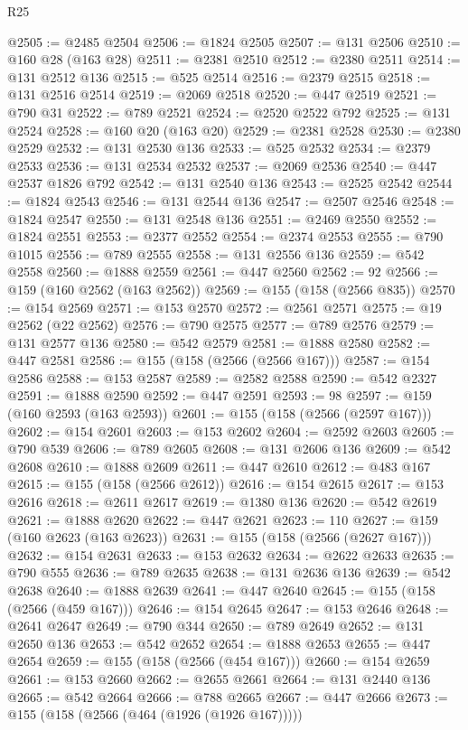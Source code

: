 \begin{lexlean}{R25}
\begin{coremodule}
{{{{{{{{{{{{{{{{{{{{{{{{{{{{{{{{{{{{{{{{{{{{{{{{{{{{{{{{{{{{{{{{{{{{{{{{{{{{{{{{{{{{{{{{{{{{{{{{{{{{{{{{{{{{{{{{{{{{{{{{{{{{{{{{{{{{{{{{{{{{{{{{{{{{{{{{{{{{{{{{{{{{{{{{{{{{{{{{{{{{{{{{{{{{{{{{{{{{{{{@2505 := @2485 @2504
@2506 := @1824 @2505
@2507 := @131 @2506
@2510 := @160 @28 (@163 @28)
@2511 := @2381 @2510
@2512 := @2380 @2511
@2514 := @131 @2512 @136
@2515 := @525 @2514
@2516 := @2379 @2515
@2518 := @131 @2516 @2514
@2519 := @2069 @2518
@2520 := @447 @2519
@2521 := @790 @31
@2522 := @789 @2521
@2524 := @2520 @2522 @792
@2525 := @131 @2524
@2528 := @160 @20 (@163 @20)
@2529 := @2381 @2528
@2530 := @2380 @2529
@2532 := @131 @2530 @136
@2533 := @525 @2532
@2534 := @2379 @2533
@2536 := @131 @2534 @2532
@2537 := @2069 @2536
@2540 := @447 @2537 @1826 @792
@2542 := @131 @2540 @136
@2543 := @2525 @2542
@2544 := @1824 @2543
@2546 := @131 @2544 @136
@2547 := @2507 @2546
@2548 := @1824 @2547
@2550 := @131 @2548 @136
@2551 := @2469 @2550
@2552 := @1824 @2551
@2553 := @2377 @2552
@2554 := @2374 @2553
@2555 := @790 @1015
@2556 := @789 @2555
@2558 := @131 @2556 @136
@2559 := @542 @2558
@2560 := @1888 @2559
@2561 := @447 @2560
@2562 := 92
@2566 := @159 (@160 @2562 (@163 @2562))
@2569 := @155 (@158 (@2566 @835))
@2570 := @154 @2569
@2571 := @153 @2570
@2572 := @2561 @2571
@2575 := @19 @2562 (@22 @2562)
@2576 := @790 @2575
@2577 := @789 @2576
@2579 := @131 @2577 @136
@2580 := @542 @2579
@2581 := @1888 @2580
@2582 := @447 @2581
@2586 := @155 (@158 (@2566 (@2566 @167)))
@2587 := @154 @2586
@2588 := @153 @2587
@2589 := @2582 @2588
@2590 := @542 @2327
@2591 := @1888 @2590
@2592 := @447 @2591
@2593 := 98
@2597 := @159 (@160 @2593 (@163 @2593))
@2601 := @155 (@158 (@2566 (@2597 @167)))
@2602 := @154 @2601
@2603 := @153 @2602
@2604 := @2592 @2603
@2605 := @790 @539
@2606 := @789 @2605
@2608 := @131 @2606 @136
@2609 := @542 @2608
@2610 := @1888 @2609
@2611 := @447 @2610
@2612 := @483 @167
@2615 := @155 (@158 (@2566 @2612))
@2616 := @154 @2615
@2617 := @153 @2616
@2618 := @2611 @2617
@2619 := @1380 @136
@2620 := @542 @2619
@2621 := @1888 @2620
@2622 := @447 @2621
@2623 := 110
@2627 := @159 (@160 @2623 (@163 @2623))
@2631 := @155 (@158 (@2566 (@2627 @167)))
@2632 := @154 @2631
@2633 := @153 @2632
@2634 := @2622 @2633
@2635 := @790 @555
@2636 := @789 @2635
@2638 := @131 @2636 @136
@2639 := @542 @2638
@2640 := @1888 @2639
@2641 := @447 @2640
@2645 := @155 (@158 (@2566 (@459 @167)))
@2646 := @154 @2645
@2647 := @153 @2646
@2648 := @2641 @2647
@2649 := @790 @344
@2650 := @789 @2649
@2652 := @131 @2650 @136
@2653 := @542 @2652
@2654 := @1888 @2653
@2655 := @447 @2654
@2659 := @155 (@158 (@2566 (@454 @167)))
@2660 := @154 @2659
@2661 := @153 @2660
@2662 := @2655 @2661
@2664 := @131 @2440 @136
@2665 := @542 @2664
@2666 := @788 @2665
@2667 := @447 @2666
@2673 := @155 (@158 (@2566 (@464 (@1926 (@1926 @167)))))
}}}}}}}}}}}}}}}}}}}}}}}}}}}}}}}}}}}}}}}}}}}}}}}}}}}}}}}}}}}}}}}}}}}}}}}}}}}}}}}}}}}}}}}}}}}}}}}}}}}}}}}}}}}}}}}}}}}}}}}}}}}}}}}}}}}}}}}}}}}}}}}}}}}}}}}}}}}}}}}}}}}}}}}}}}}}}}}}}}}}}}}}}}}}}}}}}}}}}}}
\end{coremodule}
\end{lexlean}

